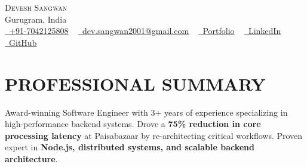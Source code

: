 \documentclass[letterpaper,11pt]{article}
\begin{document}
\begin{center}
    {\Huge \scshape Devesh Sangwan} \\ \vspace{1pt}
    Gurugram, India \\
    \small \href{tel:+91-7042125808}{\raisebox{-0.1\height}\faPhone~+91-7042125808} ~
    \href{mailto:dev.sangwan2001@gmail.com}{\raisebox{-0.2\height}\faEnvelope~dev.sangwan2001@gmail.com} ~
    \href{https://deveshsangwan.com}{\raisebox{-0.1\height}{\faGlobe}~Portfolio} ~
    \href{https://www.linkedin.com/in/deveshsangwan/}{\raisebox{-0.2\height}\faLinkedin~LinkedIn} ~
    \href{https://github.com/deveshsangwan}{\raisebox{-0.2\height}\faGithub~GitHub}
\end{center}


\section{PROFESSIONAL SUMMARY}
\vspace{-2pt}
\small{Award-winning Software Engineer with 3+ years of experience specializing in high-performance backend systems. Drove a \textbf{75\% reduction in core processing latency} at Paisabazaar by re-architecting critical workflows. Proven expert in \textbf{Node.js, distributed systems, and scalable backend architecture}.}


\end{document}
